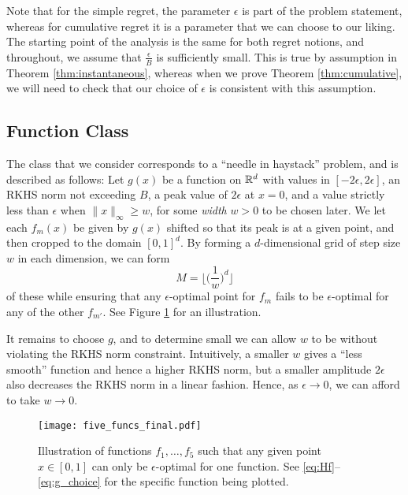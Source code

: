 \documentclass[english,onecolumn,final,11pt]{IEEEtran} %
\begin{document}
Note that for the simple regret, the parameter $\epsilon$ is part of the problem statement, whereas for cumulative regret it is a parameter that we can choose to our liking.  The starting point of the analysis is the same for both regret notions, and throughout, we assume that $\frac{\epsilon}{B}$ is sufficiently small.  This is true by assumption in Theorem \ref{thm:instantaneous}, whereas when we prove Theorem \ref{thm:cumulative}, we will need to check that our choice of $\epsilon$ is consistent with this assumption.

\subsection{Function Class} \label{sec:FUNC_CLASS}

The class that we consider corresponds to a ``needle in haystack'' problem, and is described as follows: Let $g(x)$ be a function on $\mathbb{R}^d$ with values in $[-2\epsilon,2\epsilon]$, an RKHS norm not exceeding $B$, a peak value of $2\epsilon$ at $x = 0$, and a value strictly less than $\epsilon$ when $\|x\|_{\infty} \ge w$, for some \emph{width} $w > 0$ to be chosen later.  We let each $f_m(x)$ be given by $g(x)$ shifted so that its peak is at a given point, and then cropped to the domain $[0,1]^d$. By forming a $d$-dimensional grid of step size $w$ in each dimension, we can form
\begin{equation}
    M = \bigg\lfloor \bigg( \frac{1}{w} \bigg)^d \bigg\rfloor  \label{eq:M_choice}
\end{equation}
of these while ensuring that any $\epsilon$-optimal point for $f_m$ fails to be $\epsilon$-optimal for any of the other $f_{m'}$.  See Figure \ref{fig:func_class} for an illustration.

It remains to choose $g$, and to determine small we can allow $w$ to be without violating the RKHS norm constraint.  Intuitively, a smaller $w$ gives a ``less smooth'' function and hence a higher RKHS norm, but a smaller amplitude $2\epsilon$ also decreases the RKHS norm in a linear fashion.  Hence, as $\epsilon \to 0$, we can afford to take $w \to 0$.

\begin{figure}
    \begin{centering}
        \texttt{[image: five\_funcs\_final.pdf]}
        \par
    \end{centering}
    
    \caption{Illustration of functions $f_1,\dotsc,f_5$ such that any given point $x \in [0,1]$ can only be $\epsilon$-optimal for one function.  See \eqref{eq:Hf}--\eqref{eq:g_choice} for the specific function being plotted. \label{fig:func_class}}
\end{figure}
\end{document}
